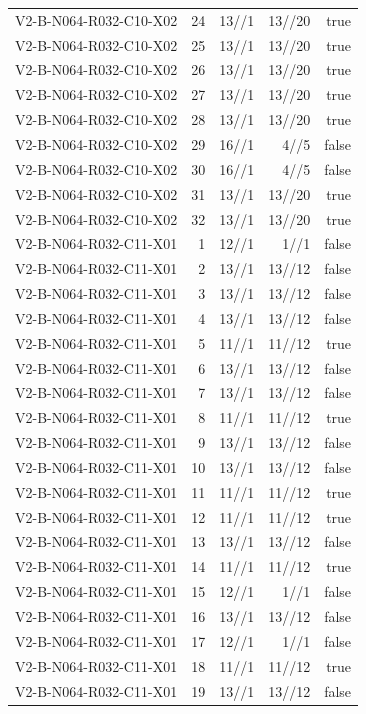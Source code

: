 {\begin{longtable}{lrrrr}
V2-B-N064-R032-C10-X02 & 24 & 13//1 & 13//20 & true \\
V2-B-N064-R032-C10-X02 & 25 & 13//1 & 13//20 & true \\
V2-B-N064-R032-C10-X02 & 26 & 13//1 & 13//20 & true \\
V2-B-N064-R032-C10-X02 & 27 & 13//1 & 13//20 & true \\
V2-B-N064-R032-C10-X02 & 28 & 13//1 & 13//20 & true \\
V2-B-N064-R032-C10-X02 & 29 & 16//1 & 4//5 & false \\
V2-B-N064-R032-C10-X02 & 30 & 16//1 & 4//5 & false \\
V2-B-N064-R032-C10-X02 & 31 & 13//1 & 13//20 & true \\
V2-B-N064-R032-C10-X02 & 32 & 13//1 & 13//20 & true \\
V2-B-N064-R032-C11-X01 & 1 & 12//1 & 1//1 & false \\
V2-B-N064-R032-C11-X01 & 2 & 13//1 & 13//12 & false \\
V2-B-N064-R032-C11-X01 & 3 & 13//1 & 13//12 & false \\
V2-B-N064-R032-C11-X01 & 4 & 13//1 & 13//12 & false \\
V2-B-N064-R032-C11-X01 & 5 & 11//1 & 11//12 & true \\
V2-B-N064-R032-C11-X01 & 6 & 13//1 & 13//12 & false \\
V2-B-N064-R032-C11-X01 & 7 & 13//1 & 13//12 & false \\
V2-B-N064-R032-C11-X01 & 8 & 11//1 & 11//12 & true \\
V2-B-N064-R032-C11-X01 & 9 & 13//1 & 13//12 & false \\
V2-B-N064-R032-C11-X01 & 10 & 13//1 & 13//12 & false \\
V2-B-N064-R032-C11-X01 & 11 & 11//1 & 11//12 & true \\
V2-B-N064-R032-C11-X01 & 12 & 11//1 & 11//12 & true \\
V2-B-N064-R032-C11-X01 & 13 & 13//1 & 13//12 & false \\
V2-B-N064-R032-C11-X01 & 14 & 11//1 & 11//12 & true \\
V2-B-N064-R032-C11-X01 & 15 & 12//1 & 1//1 & false \\
V2-B-N064-R032-C11-X01 & 16 & 13//1 & 13//12 & false \\
V2-B-N064-R032-C11-X01 & 17 & 12//1 & 1//1 & false \\
V2-B-N064-R032-C11-X01 & 18 & 11//1 & 11//12 & true \\
V2-B-N064-R032-C11-X01 & 19 & 13//1 & 13//12 & false \\

\end{longtable}}
